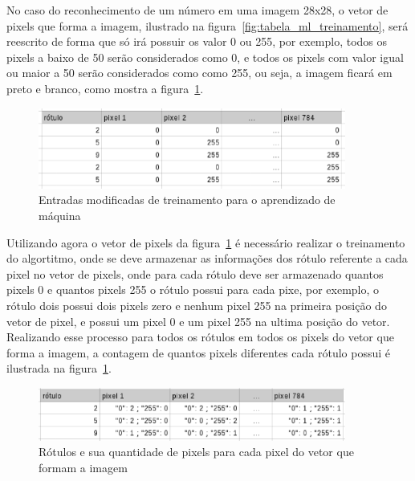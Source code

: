 No caso do reconhecimento de um número em uma imagem 28x28, o vetor de pixels
que forma a imagem, ilustrado na figura~\ref{fig:tabela_ml_treinamento}, será
reescrito de forma que só irá possuir os valor 0 ou 255, por exemplo, todos os
pixels a baixo de 50 serão considerados como 0, e todos os pixels com valor igual
ou maior a 50 serão considerados como como 255, ou seja, a imagem ficará em preto
e branco, como mostra a figura~\ref{fig:tabela_ml_treinamento_convertida}.

\begin{figure}[h]
  \centering
  \includegraphics[width=0.9\textwidth]{figuras/tabela_ml_treinamento_convertida.eps}
  \caption{Entradas modificadas de treinamento para o aprendizado de máquina}
  \label{fig:tabela_ml_treinamento_convertida}
\end{figure}

Utilizando agora o vetor de pixels da figura~\ref{fig:tabela_ml_treinamento_convertida}
é necessário realizar o treinamento do algortitmo, onde se deve armazenar as informações
dos rótulo referente a cada pixel no vetor de pixels, onde para cada rótulo deve ser
armazenado quantos pixels 0 e quantos pixels 255 o rótulo possui para cada pixe, por
exemplo, o rótulo dois possui dois pixels zero e nenhum pixel 255 na primeira posição do
vetor de pixel, e possui um pixel 0 e um pixel 255 na ultima posição do vetor. Realizando
esse processo para todos os rótulos em todos os pixels do vetor que forma a imagem, a
contagem de quantos pixels diferentes cada rótulo possui é ilustrada na
figura~\ref{fig:tabela_ml_treinamento_convertida}.

\begin{figure}[h]
  \centering
  \includegraphics[width=0.9\textwidth]{figuras/rotulos_e_pixels.eps}
  \caption{Rótulos e sua quantidade de pixels para cada pixel do vetor que formam a imagem}
  \label{fig:rotulos_e_pixels}
\end{figure}

